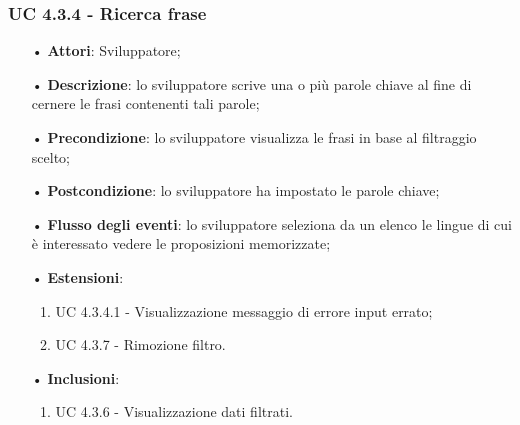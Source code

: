 \subsubsection{UC 4.3.4 - Ricerca frase}
\begin{itemize}
	\item[•]\textbf{Attori}: Sviluppatore;
	\item[•]\textbf{Descrizione}: lo sviluppatore scrive una o più parole chiave al fine di cernere le frasi contenenti tali parole;
	\item[•]\textbf{Precondizione}: lo sviluppatore visualizza le frasi in base al filtraggio scelto;
	\item[•]\textbf{Postcondizione}: lo sviluppatore ha impostato le parole chiave;
	\item[•]\textbf{Flusso degli eventi}: lo sviluppatore seleziona da un elenco le lingue di cui è interessato vedere le proposizioni memorizzate;
	\item[•]\textbf{Estensioni}: 
	\begin{enumerate}
		\item UC 4.3.4.1 - Visualizzazione messaggio di errore input errato;
		\item UC 4.3.7 - Rimozione filtro.
	\end{enumerate}
	\item[•]\textbf{Inclusioni}:
	\begin{enumerate}
		\item UC 4.3.6 - Visualizzazione dati filtrati.
	\end{enumerate}
\end{itemize}
